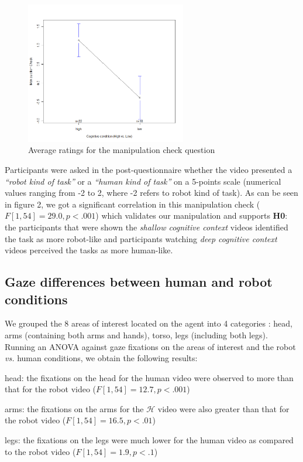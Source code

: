 \documentclass[lettersize, noapacite, twoside, HRI]{apa_HRI}
\newcommand{\vs}{\textit{vs.}\xspace}
\newcommand{\h}[1]{\textbf{H#1}\xspace}
\begin{document}
\begin{figure}
    \centering
    \includegraphics[width=7cm]{ManipulationCheck}
    \caption{Average ratings for the manipulation check question}
    \label{fig:ManipulationCheck}
\end{figure}


Participants were asked in the post-questionnaire whether the video presented a
\emph{``robot kind of task''} or a \emph{``human kind of task''} on a 5-points
scale (numerical values ranging from -2 to 2, where -2 refers to robot kind of
task). As can be seen in figure 2, we got a significant correlation in this
manipulation check ($F[1,54] = 29.0, p < .001$) which validates our manipulation
and supports \h{0}: the participants that were shown the \emph{shallow cognitive
context} videos identified the task as more robot-like and participants watching
\emph{deep cognitive context} videos perceived the tasks as more human-like. 


\subsection{Gaze differences between human and robot conditions}

We grouped the 8 areas of interest located on the agent into 4 categories : {\sf
head}, {\sf arms} (containing both arms and hands), {\sf torso}, {\sf legs}
(including both legs). Running an ANOVA against gaze fixations on the areas of
interest and the robot \vs human conditions, we obtain the following results:

{\sf head}: the fixations on the head for the human video
were observed to more than that for the robot video ($F[1,54] = 12.7, p < .001$)

{\sf arms}: the fixations on the arms for the $\mathcal{H}$ video
were also greater than that for the robot video ($F[1,54] = 16.5, p < .01$)

{\sf legs}: the fixations on the legs were much lower
for the human video as compared to the robot video ($F[1,54] = 1.9, p < .1$)
\end{document}
